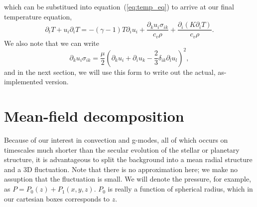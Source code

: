 \documentclass[letterpaper,12pt]{paper}
\begin{document}
which can be substitued into equation~(\ref{eq:temp_eq}) to arrive at
our final temperature equation,
\begin{equation}
  \label{eq:final_temperature}
    \partial_t T + u_i \partial_i T  = -(\gamma - 1) T \partial_i
    u_i + \frac{\partial_k u_i \sigma_{ik}}{c_v \rho}
  + \frac{\partial_i (K \partial_i T)}{c_v \rho}.
\end{equation}
We also note that we can write
\begin{equation}
  \label{eq:square_sigma}
  \partial_k u_i \sigma_{ik} = \frac{\mu}{2} \left(\partial_k u_i
    + \partial_i u_k - \frac{2}{3} \delta_{ik} \partial_l u_l
  \right)^2,
\end{equation}
and in the next section, we will use this form to write out the
actual, as-implemented version.

\section{Mean-field decomposition}
\label{sec:meanfield}
Because of our interest in convection and g-modes, all of which occurs
on timescales much shorter than the secular evolution of the stellar
or planetary structure, it is advantageous to split the background
into a mean radial structure and a 3D fluctuation. Note that there is
no approximation here; we make no assuption that the fluctuation is
small. We will denote the pressure, for example, as $P = P_0(z) +
P_1(x,y,z)$. $P_0$ is really a function of spherical radius, which in our
cartesian boxes corresponds to $z$. 
\end{document}
